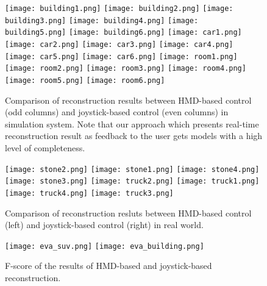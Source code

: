 \documentclass[journal]{IEEEtran}
\begin{document}
\begin{figure*}[tbp]
  \centering
    \texttt{[image: building1.png]}
    \texttt{[image: building2.png]}
    \texttt{[image: building3.png]}
    \texttt{[image: building4.png]}
    \texttt{[image: building5.png]}
    \texttt{[image: building6.png]}
    \texttt{[image: car1.png]}
    \texttt{[image: car2.png]}
    \texttt{[image: car3.png]}
    \texttt{[image: car4.png]}
    \texttt{[image: car5.png]}
    \texttt{[image: car6.png]}
    \texttt{[image: room1.png]}
    \texttt{[image: room2.png]}
    \texttt{[image: room3.png]}
    \texttt{[image: room4.png]}
    \texttt{[image: room5.png]}
    \texttt{[image: room6.png]}
    \caption{Comparison of reconstruction results between HMD-based control (odd columns) and joystick-based control 
    (even columns) in simulation system. Note that our approach which presents real-time reconstruction result as feedback 
    to the user gets models with a high level of completeness.}
    \label{fig:ReconstructionCompSimu}
\end{figure*}

\begin{figure}[t]
  \centering
  \texttt{[image: stone2.png]}
  \texttt{[image: stone1.png]}
  \texttt{[image: stone4.png]}
  \texttt{[image: stone3.png]}
  \texttt{[image: truck2.png]}
  \texttt{[image: truck1.png]}
  \texttt{[image: truck4.png]}
  \texttt{[image: truck3.png]}
  \caption{Comparison of reconstruction resluts between HMD-based control (left) and joystick-based control 
  (right) in real world. }
  \label{fig:ReconstructionCompReal}
\end{figure}

\begin{figure}[t]
  \centering
  \texttt{[image: eva\_suv.png]}
  \texttt{[image: eva\_building.png]}
  \caption{F-score of the results of HMD-based and joystick-based reconstruction.}
  \label{fig:f-score}
\end{figure}
\end{document}
